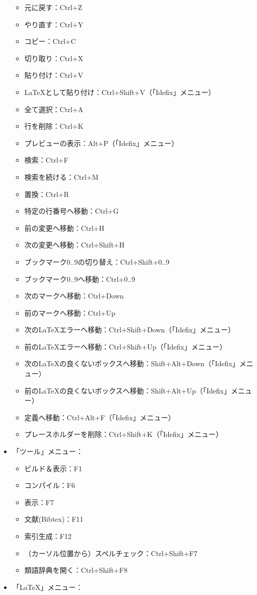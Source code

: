 \begin{itemize}
  \begin{itemize}
  \item
    元に戻す：Ctrl+Z
  \item
    やり直す：Ctrl+Y
  \item
    コピー：Ctrl+C
  \item
    切り取り：Ctrl+X
  \item
    貼り付け：Ctrl+V
  \item
    LaTeXとして貼り付け：Ctrl+Shift+V（「Idefix」メニュー）
  \item
    全て選択：Ctrl+A
  \item
    行を削除：Ctrl+K
  \item
    プレビューの表示：Alt+P（「Idefix」メニュー）
  \item
    検索：Ctrl+F
  \item
    検索を続ける：Ctrl+M
  \item
    置換：Ctrl+R
  \item
    特定の行番号へ移動：Ctrl+G
  \item
    前の変更へ移動：Ctrl+H
  \item
    次の変更へ移動：Ctrl+Shift+H
  \item
    ブックマーク0..9の切り替え：Ctrl+Shift+0..9
  \item
    ブックマーク0..9へ移動：Ctrl+0..9
  \item
    次のマークへ移動：Ctrl+Down
  \item
    前のマークへ移動：Ctrl+Up
  \item
    次のLaTeXエラーへ移動：Ctrl+Shift+Down（「Idefix」メニュー）
  \item
    前のLaTeXエラーへ移動：Ctrl+Shift+Up（「Idefix」メニュー）
  \item
    次のLaTeXの良くないボックスへ移動：Shift+Alt+Down（「Idefix」メニュー）
  \item
    前のLaTeXの良くないボックスへ移動：Shift+Alt+Up（「Idefix」メニュー）
  \item
    定義へ移動：Ctrl+Alt+F（「Idefix」メニュー）
  \item
    プレースホルダーを削除：Ctrl+Shift+K（「Idefix」メニュー）
  \end{itemize}
\item
  「ツール」メニュー：

  \begin{itemize}
  \item
    ビルド＆表示：F1
  \item
    コンパイル：F6
  \item
    表示：F7
  \item
    文献(Bibtex)：F11
  \item
    索引生成：F12
  \item
    （カーソル位置から）スペルチェック：Ctrl+Shift+F7
  \item
    類語辞典を開く：Ctrl+Shift+F8
  \end{itemize}
\item
  「LaTeX」メニュー：


\end{itemize}
